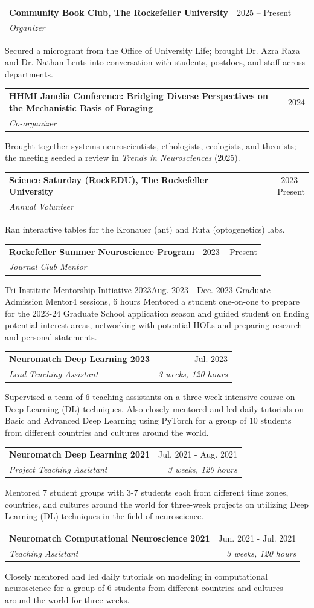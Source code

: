 \documentclass[letterpaper,9pt]{article}
\makeatletter
\newcommand{\resumeSubheadingWithText}[5]{
  \vspace{-1pt}\item
    \begin{tabular*}{0.97\textwidth}[t]{l@{\extracolsep{\fill}}r}
      \textbf{#1} & #2 \\
      \textit{\small#3} & \textit{\small #4}
    \end{tabular*}\vspace{2pt}
}
\makeatother
\begin{document}
\resumeSubheadingWithText
  {Community Book Club, The Rockefeller University}{2025 -- Present}
  {Organizer}{}
  \small{Secured a microgrant from the Office of University Life; brought Dr. Azra Raza and Dr. Nathan Lents into conversation with students, postdocs, and staff across departments.}

\resumeSubheadingWithText
  {HHMI Janelia Conference: Bridging Diverse Perspectives on the Mechanistic Basis of Foraging}{2024}
  {Co-organizer}{}
  \small{Brought together systems neuroscientists, ethologists, ecologists, and theorists; the meeting seeded a review in \textit{Trends in Neurosciences} (2025).}

\resumeSubheadingWithText
  {Science Saturday (RockEDU), The Rockefeller University}{2023 -- Present}
  {Annual Volunteer}{}
  \small{Ran interactive tables for the Kronauer (ant) and Ruta (optogenetics) labs.}

\resumeSubheadingWithText
  {Rockefeller Summer Neuroscience Program}{2023 -- Present}
  {Journal Club Mentor}{}

\resumeSubheadingWithText
  {Tri-Institute Mentorship Initiative 2023}{Aug. 2023 - Dec. 2023}
  {Graduate Admission Mentor}{4 sessions, 6 hours}
  \small{Mentored a student one-on-one to prepare for the 2023-24 Graduate School application season and guided student on finding potential interest areas, networking with potential HOLs and preparing research and personal statements.}

\resumeSubheadingWithText
  {Neuromatch Deep Learning 2023}{Jul. 2023}
  {Lead Teaching Assistant}{3 weeks, 120 hours}
  \small{Supervised a team of 6 teaching assistants on a three-week intensive course on Deep Learning (DL) techniques. Also closely mentored and led daily tutorials on Basic and Advanced Deep Learning using PyTorch for a group of 10 students from different countries and cultures around the world.}
                 
\resumeSubheadingWithText
  {Neuromatch Deep Learning 2021}{Jul. 2021 - Aug. 2021}
  {Project Teaching Assistant}{3 weeks, 120 hours}
  \small{Mentored 7 student groups with 3-7 students each from different time zones, countries, and cultures around the world for three-week projects on utilizing Deep Learning (DL) techniques in the field of neuroscience.}
  
\resumeSubheadingWithText
  {Neuromatch Computational Neuroscience 2021}{Jun. 2021 - Jul. 2021}
  {Teaching Assistant}{3 weeks, 120 hours}
  \small{Closely mentored and led daily tutorials on modeling in computational neuroscience for a group of 6 students from different countries and cultures around the world for three weeks.}
  
\end{document}
